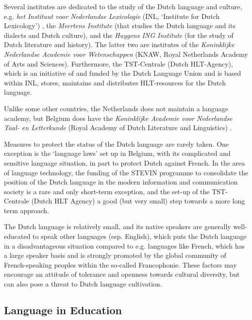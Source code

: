 \documentclass[]{../../metanetpaper}
\begin{document}
\begin{multicols}{2}
    Several institutes are dedicated to the study of the Dutch language and culture, e.g. \textit{het Instituut voor Nederlandse Lexicologie} (INL, `Institute for Dutch Lexicology') \cite{INL}, the \textit{Meertens Institute} \cite{MI} (that studies the Dutch language and its dialects and Dutch culture), and the \textit{Huygens ING Institute} \cite{HING} (for the study of Dutch literature and history). The latter two are institutes of the \textit{Koninklijke Nederlandse Academie voor Wetenschappen} \cite{KNAW} (KNAW, Royal Netherlands Academy of Arts and Sciences).  Furthermore, the TST-Centrale \cite{TST-Centrale} (Dutch HLT-Agency), which is an initiative of and funded by the Dutch Language Union and is based within  INL, stores, maintains and distributes HLT-resources for the Dutch language.


    Unlike some other countries, the Netherlands does not maintain a language academy, but Belgium does have the \textit{Koninklijke Academie voor Nederlandse Taal- en Letterkunde} (Royal Academy of Dutch Literature and Linguistics) \cite{Kantl}.

    Measures to protect the status of the Dutch language are rarely taken. One exception is the `language laws' set up in Belgium, with its complicated and sensitive language situation, in part to protect Dutch against French. In the area of language technology, the funding of the STEVIN programme to consolidate the position of the Dutch language in the modern information and communication society is a rare and only short-term exception, and the set-up of the TST-Centrale (Dutch HLT Agency) a good (but very small) step towards a more long term approach.

    The Dutch language is relatively small, and its native speakers are generally well-educated to speak other languages (esp. English), which puts the Dutch language in a disadvantageous situation compared to e.g. languages like French, which has a large speaker basis and  is strongly promoted by the global community of French-speaking peoples within the so-called Francophonie. These factors may encourage an attitude of tolerance and openness towards cultural diversity, but can also pose a threat to Dutch language cultivation.

\subsection{Language in Education}


\end{multicols}
\end{document}
